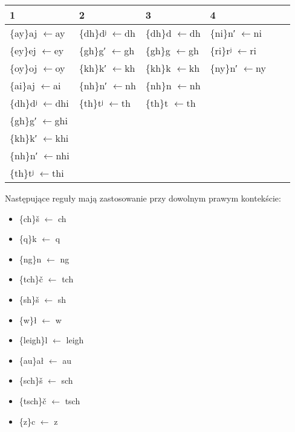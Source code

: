 \documentclass{article}
\begin{document}
\begin{center}
\begin{longtable}{l|l|l|l|l|l}
	1 & 2 & 3 & 4 \\
\hline
\{ay\}aj $\leftarrow $ay & \{dh\}dʲ $\leftarrow $dh & \{dh\}d $\leftarrow $dh & \{ni\}n′ $\leftarrow $ni \\
\{ey\}ej $\leftarrow $ey & \{gh\}g′ $\leftarrow $gh & \{gh\}g $\leftarrow $gh & \{ri\}rʲ $\leftarrow $ri \\
\{oy\}oj $\leftarrow $oy & \{kh\}k′ $\leftarrow $kh & \{kh\}k $\leftarrow $kh & \{ny\}n′ $\leftarrow $ny \\
\{ai\}aj $\leftarrow $ai & \{nh\}n′ $\leftarrow $nh & \{nh\}n $\leftarrow $nh &   \\
\{dh\}dʲ $\leftarrow $dhi & \{th\}tʲ $\leftarrow $th & \{th\}t $\leftarrow $th &   \\
\{gh\}g′ $\leftarrow $ghi &   &   &   \\
\{kh\}k′ $\leftarrow $khi &   &   &   \\
\{nh\}n′ $\leftarrow $nhi &   &   &   \\
\{th\}tʲ $\leftarrow $thi &   &   &   \\
\end{longtable}
\end{center}

Następujące reguły mają zastosowanie przy dowolnym prawym kontekście:
\begin{multicols}{3}\begin{itemize}
\item \{ch\}š $\leftarrow$ ch
\item \{q\}k $\leftarrow$ q
\item \{ng\}n $\leftarrow$ ng
\item \{tch\}č $\leftarrow$ tch
\item \{sh\}š $\leftarrow$ sh
\item \{w\}ł $\leftarrow$ w
\item \{leigh\}l $\leftarrow$ leigh
\item \{au\}ał $\leftarrow$ au
\item \{sch\}š $\leftarrow$ sch
\item \{tsch\}č $\leftarrow$ tsch
\item \{z\}c $\leftarrow$ z
\end{itemize}\end{multicols}
\end{document}
